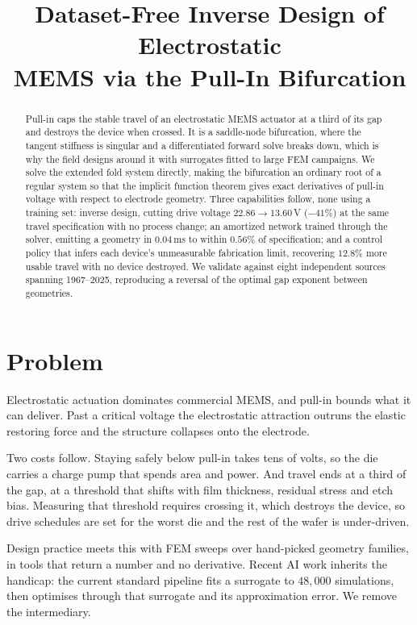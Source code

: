 \documentclass[conference,10pt]{IEEEtran}
\title{Dataset-Free Inverse Design of Electrostatic\\
MEMS via the Pull-In Bifurcation}
\author{\IEEEauthorblockN{Tushar Dudeja, \emph{Student Member, IEEE}, and
Nawaz Shafi, \emph{Member, IEEE}\\
\normalfont\normalsize Vellore Institute of Technology, India}}
\begin{document}
\maketitle

\begin{abstract}
Pull-in caps the stable travel of an electrostatic MEMS actuator at a third of
its gap and destroys the device when crossed. It is a saddle-node bifurcation,
where the tangent stiffness is singular and a differentiated forward solve
breaks down, which is why the field designs around it with surrogates fitted to
large FEM campaigns. We solve the extended fold system directly, making the
bifurcation an ordinary root of a regular system so that the implicit function
theorem gives exact derivatives of pull-in voltage with respect to electrode
geometry. Three capabilities follow, none using a training set: inverse design,
cutting drive voltage $22.86\rightarrow13.60$\,V ($-41\%$) at the same travel
specification with no process change; an amortized network trained through the
solver, emitting a geometry in $0.04$\,ms to within $0.56\%$ of specification;
and a control policy that infers each device's unmeasurable fabrication limit,
recovering $12.8\%$ more usable travel with no device destroyed. We validate
against eight independent sources spanning 1967--2025, reproducing a reversal
of the optimal gap exponent between geometries.
\end{abstract}

\section{Problem}

Electrostatic actuation dominates commercial MEMS, and pull-in bounds what it
can deliver. Past a critical voltage the electrostatic attraction outruns the
elastic restoring force and the structure collapses onto the electrode.

Two costs follow. Staying safely below pull-in takes tens of volts, so the die
carries a charge pump that spends area and power. And travel ends at a third of
the gap, at a threshold that shifts with film thickness, residual stress and
etch bias. Measuring that threshold requires crossing it, which destroys the
device, so drive schedules are set for the worst die and the rest of the wafer
is under-driven.

Design practice meets this with FEM sweeps over hand-picked geometry families,
in tools that return a number and no derivative. Recent AI work inherits the
handicap: the current standard pipeline \cite{zhang} fits a surrogate to
$48{,}000$ simulations, then optimises through that surrogate and its
approximation error. We remove the intermediary.
\end{document}
